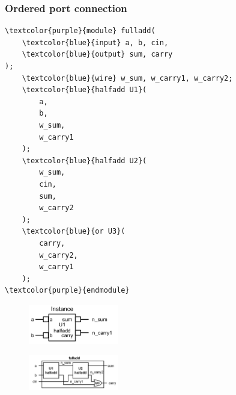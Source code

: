 \documentclass[t, notes]{beamer}
\begin{document}
\begin{frame}[fragile]
\frametitle{Ordered port connection}
\begin{multicols}{2}
{\scriptsize%
\begin{Verbatim}[commandchars=\\\{\}, tabsize=2]
\textcolor{purple}{module} fulladd(
    \textcolor{blue}{input} a, b, cin,
    \textcolor{blue}{output} sum, carry
);
    \textcolor{blue}{wire} w_sum, w_carry1, w_carry2;
    \textcolor{blue}{halfadd U1}(
        a,
        b,
        w_sum,
        w_carry1
    );
    \textcolor{blue}{halfadd U2}(
        w_sum,
        cin,
        sum,
        w_carry2
    );
    \textcolor{blue}{or U3}(
        carry, 
        w_carry2,
        w_carry1
    );
\textcolor{purple}{endmodule}
\end{Verbatim}
}
\columnbreak
\begin{figure}[H!]
	\includegraphics[width=0.35\textwidth]{img/03_inst.png}
\end{figure}
\begin{figure}[H!]
    \includegraphics[width=0.35\textwidth]{img/03_fulladd.png}
\end{figure}
\end{multicols}
\end{frame}
\end{document}
